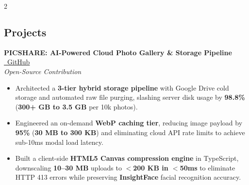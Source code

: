 \documentclass[10pt, a4paper]{article}
\newcommand{\entry}[4]{%
  \vspace{2pt}
  {\bfseries\color{bodytext} #1}\hfill{\small\color{lightgray} #3}\\
  {\small\itshape\color{accent} #2}\hfill{\small\color{lightgray} #4}
  \vspace{2pt}
}
\newenvironment{bullets}{%
  \begin{itemize}[leftmargin=1.1em, itemsep=1pt, topsep=2pt, parsep=0pt]
  \small\color{bodytext}
}{\end{itemize}}
\begin{document}
\begin{paracol}{2}
\begin{leftcolumn}
\begin{minipage}[t]{\dimexpr\linewidth-16pt}
\end{minipage}
\end{leftcolumn}

\begin{rightcolumn}
\hspace{10pt}\begin{minipage}[t]{\dimexpr\linewidth-20pt}
\vspace{16pt}

\section{Projects}


\entry{PICSHARE: AI-Powered Cloud Photo Gallery \& Storage Pipeline}%
      {Open-Source Contribution}%
      {\href{https://github.com/Dreamgamer5000/rabagot}{\faIcon{github}~GitHub}}%
      {}
\begin{bullets}
  \item Architected a \textbf{3-tier hybrid storage pipeline} with Google Drive cold storage and automated raw file purging, slashing server disk usage by \textbf{98.8\%} (\textbf{300+ GB to 3.5 GB} per 10k photos).
  \item Engineered an on-demand \textbf{WebP caching tier}, reducing image payload by \textbf{95\%} (\textbf{30 MB to 300 KB}) and eliminating cloud API rate limits to achieve sub-10ms modal load latency.
  \item Built a client-side \textbf{HTML5 Canvas compression engine} in TypeScript, downscaling \textbf{10--30 MB} uploads to \textbf{$<$200 KB in $<$50ms} to eliminate HTTP 413 errors while preserving \textbf{InsightFace} facial recognition accuracy.
\end{bullets}

\vspace{4pt}


\end{minipage}
\end{rightcolumn}
\end{paracol}
\end{document}

